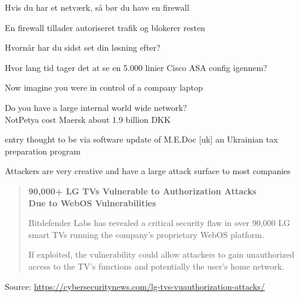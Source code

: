 \documentclass[Screen16to9,17pt]{foils}
\begin{document}


\begin{list2}
\item Hvis du har et netværk, så bør du have en firewall
\item En firewall tillader autoriseret trafik og blokerer resten
\item Hvornår har du sidst set din løsning efter?
\item Hvor lang tid tager det at se en 5.000 linier Cisco ASA config igennem?
\end{list2}



\begin{list2}
\item Now imagine you were in control of a company laptop
\item Do you have a large internal world wide network?\\
NotPetya cost Maersk about 1.9 billion DKK

\item entry thought to be via software update of M.E.Doc [uk] an Ukrainian tax preparation program
\item Attackers are very creative and have a large attack surface to most companies
\end{list2}




\begin{quote}{\large\bf
90,000+ LG TVs Vulnerable to Authorization Attacks\\
Due to WebOS Vulnerabilities}

Bitdefender Labs has revealed a critical security flaw in over 90,000 LG smart TVs running the company’s proprietary WebOS platform.

If exploited, the vulnerability could allow attackers to gain unauthorized access to the TV’s functions and potentially the user’s home network.

\end{quote}
Source: \url{https://cybersecuritynews.com/lg-tvs-vuauthorization-attacks/}
\end{document}
